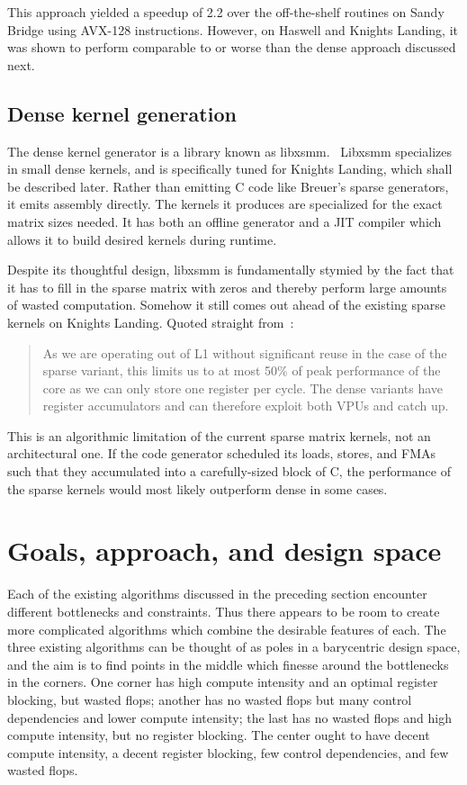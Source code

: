       This approach yielded a speedup of 2.2 over the off-the-shelf routines on Sandy Bridge using AVX-128 instructions. However, on Haswell and Knights Landing, it was shown to perform comparable to or worse than the dense approach discussed next.~\cite{Jeffers:2016:IXP:3050856}


\subsection{Dense kernel generation}

    The dense kernel generator is a library known as libxsmm.~\cite{Heinecke:2016:LAS:3014904.3015017} Libxsmm specializes in small dense kernels, and is specifically tuned for Knights Landing, which shall be described later. Rather than emitting C code like Breuer's sparse generators, it emits assembly directly. The kernels it produces are specialized for the exact matrix sizes needed. It has both an offline generator and a JIT compiler which allows it to build desired kernels during runtime. 

    Despite its thoughtful design, libxsmm is fundamentally stymied by the fact that it has to fill in the sparse matrix with zeros and thereby perform large amounts of wasted computation. Somehow it still comes out ahead of the existing sparse kernels on Knights Landing. Quoted straight from~\cite{Jeffers:2016:IXP:3050856}:

      \begin{quotation}
      As we are operating out of L1 without significant reuse in the case of the sparse variant, this limits us to at most 50\% of peak performance of the core as we can only store one register per cycle. The dense variants have register accumulators and can therefore exploit both VPUs and catch up.
      \end{quotation}

  This is an algorithmic limitation of the current sparse matrix kernels, not an architectural one. If the code generator scheduled its loads, stores, and FMAs such that they accumulated into a carefully-sized block of C, the performance of the sparse kernels would most likely outperform dense in some cases.


  \section{Goals, approach, and design space}

  Each of the existing algorithms discussed in the preceding section encounter different bottlenecks and constraints. Thus there appears to be room to create more complicated algorithms which combine the desirable features of each. The three existing algorithms can be thought of as poles in a barycentric design space, and the aim is to find points in the middle which finesse around the bottlenecks in the corners. One corner has high compute intensity and an optimal register blocking, but wasted flops; another has no wasted flops but many control dependencies and lower compute intensity; the last has no wasted flops and high compute intensity, but no register blocking. The center ought to have decent compute intensity, a decent register blocking, few control dependencies, and few wasted flops. 


